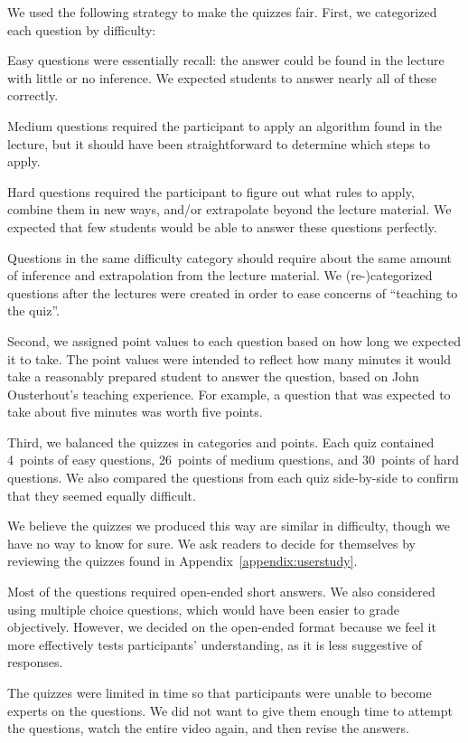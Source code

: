 We used the following strategy to make the quizzes fair. First, we
categorized each question by difficulty:
\begin{compactitem}
\item Easy questions were essentially recall: the answer could be found in the
lecture with little or no inference. We expected students to
answer nearly all of these correctly.
\item Medium questions required the participant to apply an algorithm found in
the lecture, but it should have been straightforward to determine which
steps to apply.
\item Hard questions required the participant to figure out what rules to
apply, combine them in new ways, and/or extrapolate beyond the lecture
material. We expected that few students would be able to
answer these questions perfectly.
\end{compactitem}
Questions in the same difficulty category should require about the same
amount of inference and extrapolation from the lecture material.
We (re-)categorized questions after the lectures were created in order
to ease concerns of ``teaching to the quiz''.

Second, we assigned point values to each question based on how long we expected
it to take. The point values were intended to reflect how many minutes
it would take a reasonably prepared student to answer the question,
based on John Ousterhout's teaching experience. For example, a question that was
expected to take about five minutes was worth five points.

Third, we balanced the quizzes in categories and points. Each quiz
contained \SI{4}{points} of easy questions,
\SI{26}{points} of medium questions, and
\SI{30}{points} of hard questions.
We also compared the questions from each
quiz side-by-side to confirm that they seemed equally difficult.

We believe the quizzes we produced this way are similar in
difficulty, though we have no way to know for sure. We ask readers to
decide for themselves by reviewing the quizzes found in
Appendix~\ref{appendix:userstudy}.

Most of the questions required open-ended short answers. We also
considered using multiple choice questions, which would have been easier
to grade objectively. However, we decided on the open-ended format
because we feel it more effectively tests participants' understanding,
as it is less suggestive of responses.

The quizzes were limited in time so that participants were unable to
become experts on the questions. We did not want to give them enough
time to attempt the questions, watch the entire video again, and then
revise the answers.

